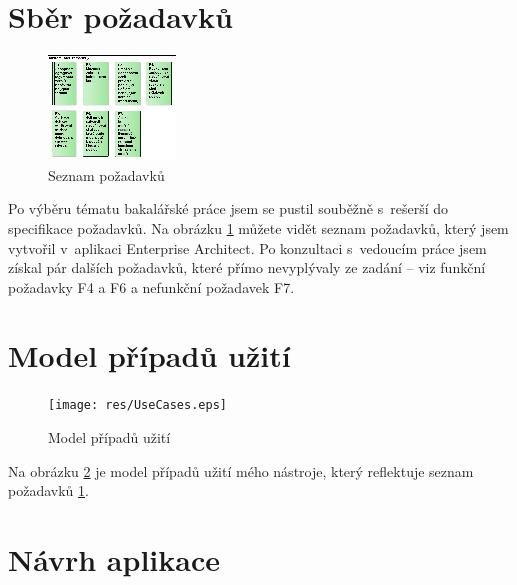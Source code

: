\documentclass[thesis=B,czech]{FITthesis}[2012/06/26]
\begin{document}
\section{Sběr požadavků}
\begin{figure}[h]
  \centering
  \includegraphics[width=\textwidth]{res/SeznamPozadavku.eps}
  \caption{Seznam požadavků}
  \label{fig:SeznamPozadavku}
\end{figure}
Po výběru tématu bakalářské práce jsem se pustil souběžně s~rešerší do specifikace požadavků. Na obrázku \ref{fig:SeznamPozadavku} můžete vidět seznam požadavků, který jsem vytvořil v~aplikaci Enterprise Architect. Po konzultaci s~vedoucím práce jsem získal pár dalších požadavků, které přímo nevyplývaly ze zadání -- viz funkční požadavky F4 a F6 a nefunkční požadavek F7.

\section{Model případů užití}
\begin{figure}[h]
  \centering
  \texttt{[image: res/UseCases.eps]}
  \caption{Model případů užití}
  \label{fig:UseCases}
\end{figure}
Na obrázku \ref{fig:UseCases} je model případů užití mého nástroje, který reflektuje seznam požadavků \ref{fig:SeznamPozadavku}. 

\section{Návrh aplikace}
\end{document}
